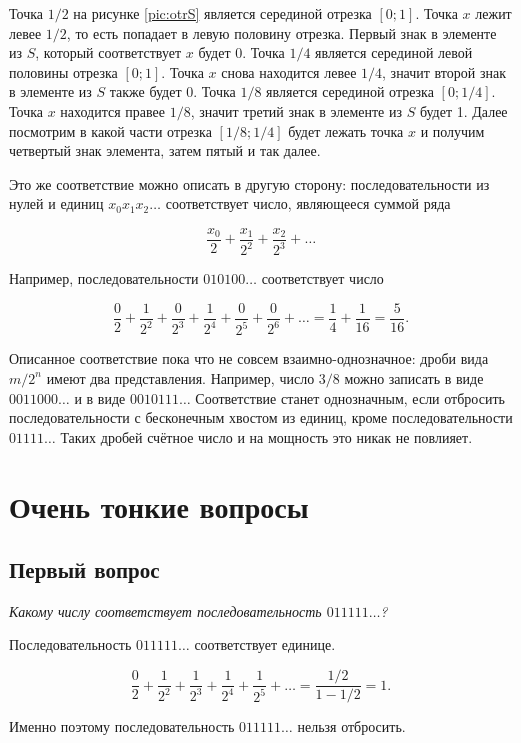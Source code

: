 \documentclass[12pt,a4paper]{article}
\begin{document}
Точка $1/2$ на рисунке \ref{pic:otrS} является серединой отрезка $[0; 1]$. Точка $x$ лежит левее $1/2$, то есть попадает в левую половину отрезка. Первый знак в элементе из $S$, который соответствует $x$ будет 0. Точка $1/4$ является серединой левой  половины отрезка $[0;1]$. Точка $x$ снова находится левее $1/4$, значит второй знак в элементе из $S$ также будет 0. Точка $1/8$ является серединой отрезка $[0; 1/4]$. Точка $x$ находится правее $1/8$, значит третий знак в элементе из $S$ будет 1. Далее посмотрим в какой части отрезка $[1/8; 1/4]$ будет лежать точка $x$ и получим четвертый знак элемента, затем пятый и так далее.

Это же соответствие можно описать в другую сторону: последовательности из нулей и единиц $x_0 x_1 x_2 \dots$ соответствует число, являющееся суммой ряда

\[ \frac{x_0}{2}+\frac{x_1}{2^2}+\frac{x_2}{2^3}+\dots \]

Например, последовательности $010100 \dots$ соответствует число

\[\frac{0}{2}+\frac{1}{2^2}+\frac{0}{2^3}+\frac{1}{2^4}+\frac{0}{2^5}+\frac{0}{2^6}+ \dots =  \frac{1}{4}+\frac{1}{16}= \frac{5}{16}.\]

Описанное соответствие пока что не совсем взаимно-однозначное: дроби вида $m/2^n$ имеют два представления. Например, число $3/8$ можно записать в виде $0011000 \dots$ и в виде $0010111 \dots$ Соответствие станет однозначным, если отбросить последовательности с бесконечным хвостом из единиц, кроме последовательности $01111 \dots$ Таких дробей счётное число и на мощность это никак не повлияет.

\section{Очень тонкие вопросы} 

\subsection{Первый вопрос}

\textit{Какому числу соответствует последовательность $011111 \dots$?}

Последовательность $011111 \dots$ соответствует единице.

\[\frac{0}{2} + \frac{1}{2^2} + \frac{1}{2^3} + \frac{1}{2^4} + \frac{1}{2^5} + \ldots = \frac{1/2}{1-1/2} = 1.\]

Именно поэтому последовательность $011111 \dots$ нельзя отбросить.
\end{document}
